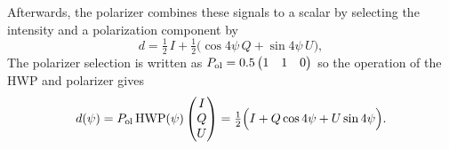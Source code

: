 \documentclass[a4paper,11pt]{article}
\begin{document}
Afterwards, the polarizer combines these signals to a scalar by selecting the intensity and a polarization component by
\begin{equation}
    d = \tfrac{1}{2}\,I + \tfrac{1}{2}\bigl(\cos 4\psi\, Q + \sin 4\psi\, U\bigr),
    \label{eq:pol-scalar}
\end{equation}
The polarizer selection is written as $P_{\rm ol} = 0.5\begin{pmatrix}1 & 1 & 0\end{pmatrix}$ so the operation of the HWP and polarizer gives
\begin{equation}
    d(\psi) = P_{\rm ol}\,\mathrm{HWP}(\psi)
    \begin{pmatrix}I\\Q\\U\end{pmatrix}
    = \tfrac{1}{2}\Bigl(I + Q\cos4\psi + U\sin4\psi\Bigr).
    \label{eq:pol-single}
\end{equation}
\end{document}
